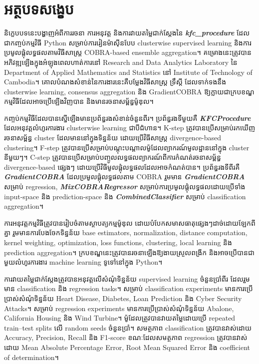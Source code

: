 \clearpage
{}
\chapter*{{\khmoul អត្ថបទសង្ខេប}}

\begin{khmer}

\hs និក្ខេបបទនេះបង្ហាញអំពីការរចនា ការអនុវត្ត និងការវាយតម្លៃជាក់ស្តែងនៃ \textbf{\textit{kfc\_procedure}} ដែលជាកញ្ចប់កម្មវិធី Python សម្រាប់ការរៀនម៉ាស៊ីនបែប clusterwise supervised learning និងការប្រមូលផ្តុំលទ្ធផលតាមវិធីសាស្ត្រ COBRA-based ensemble aggregation។ គម្រោងនេះត្រូវបានអភិវឌ្ឍឡើងក្នុងអំឡុងពេលហាត់ការនៅ Research and Data Analytics Laboratory នៃ Department of Applied Mathematics and Statistics នៅ Institute of Technology of Cambodia។ គោលបំណងសំខាន់នៃការងារនេះគឺបម្លែងវិធីសាស្ត្រ ទ្រឹស្តី ដែលទាក់ទងនឹង clusterwise learning, consensus aggregation និង GradientCOBRA ឱ្យក្លាយជាក្របខណ្ឌកម្មវិធីដែលអាចប្រើឡើងវិញបាន និងមានរចនាសម្ព័ន្ធម៉ូឌុល។

កញ្ចប់កម្មវិធីដែលបានស្នើឡើងមានប្រព័ន្ធរងសំខាន់ចំនួនពីរ។ ប្រព័ន្ធរងទីមួយគឺ \textbf{\textit{KFCProcedure}} ដែលអនុវត្តលំហូរការងារ clusterwise learning ជាបីជំហាន។ K-step ត្រូវបានប្រើសម្រាប់រកឃើញរចនាសម្ព័ន្ធ cluster ដែលមាននៅក្នុងទិន្នន័យ ដោយប្រើវិធីសាស្ត្រ divergence-based clustering។ F-step ត្រូវបានប្រើសម្រាប់បណ្តុះបណ្តាលម៉ូដែលព្យាករណ៍មូលដ្ឋាននៅក្នុង cluster នីមួយៗ។ C-step ត្រូវបានប្រើសម្រាប់បញ្ចូលលទ្ធផលព្យាករណ៍ពីការកំណត់រចនាសម្ព័ន្ធ divergence-based ផ្សេងៗ ដោយប្រើវិធីមូលផ្តុំលទ្ធផលដែលអាចកំណត់បាន។ ប្រព័ន្ធរងទីពីរគឺ \textbf{\textit{GradientCOBRA}} ដែលប្រមូលផ្តុំលទ្ធផលតាម COBRA រួមមាន \textbf{\textit{GradientCOBRA}} សម្រាប់ regression, \textbf{\textit{MixCOBRARegressor}} សម្រាប់ការប្រមូលផ្តុំលទ្ធផលដោយប្រើទាំង input-space និង prediction-space និង \textbf{\textit{CombinedClassifier}} សម្រាប់ classification aggregation។

ការអនុវត្តកម្មវិធីត្រូវបានរៀបចំតាមស្ថាបត្យកម្មម៉ូឌុល ដោយបំបែកសមាសធាតុផ្សេងៗដាច់ដោយឡែកពីគ្នា រួមមានការបែងចែកទិន្នន័យ base estimators, normalization, distance computation, kernel weighting, optimization, loss functions, clustering, local learning និង prediction aggregation។ ក្របខណ្ឌនេះត្រូវបានរចនាឡើងឱ្យងាយស្រួលពង្រីក និងអាចប្រើបានជាមួយលំហូរការងារ machine learning ទូទៅនៅក្នុង Python។

ការវាយតម្លៃជាក់ស្តែងត្រូវបានអនុវត្តលើសំណុំទិន្នន័យ supervised learning ចំនួនប្រាំពីរ ដែលរួមមាន classification និង regression tasks។ សម្រាប់ classification experiments មានការប្រើប្រាស់សំណុំទិន្នន័យ Heart Disease, Diabetes, Loan Prediction និង Cyber Security Attacks។ សម្រាប់ regression experiments មានការប្រើប្រាស់សំណុំទិន្នន័យ Abalone, California Housing និង Wind Turbine។ ម៉ូដែលត្រូវបានវាយតម្លៃដោយប្រើ repeated train--test splits លើ random seeds ចំនួនប្រាំ។ សមត្ថភាព classification ត្រូវបានវាស់ដោយ Accuracy, Precision, Recall និង F1-score ខណៈដែលសមត្ថភាព regression ត្រូវបានវាស់ដោយ Mean Absolute Percentage Error, Root Mean Squared Error និង coefficient of determination។


\end{khmer}
